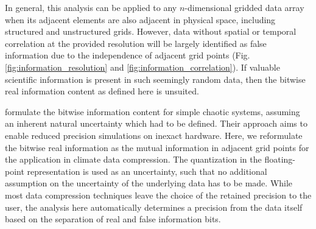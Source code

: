 In general, this analysis can be applied to any $n$-dimensional gridded data array when its adjacent elements
are also adjacent in physical space, including structured and unstructured grids. However, data without spatial
or temporal correlation at the provided resolution will be largely identified as false information due to the
independence of adjacent grid points (Fig. \ref{fig:information_resolution} and \ref{fig:information_correlation}).
If valuable scientific information is present in such seemingly random data, then the bitwise real information
content as defined here is unsuited. 

\cite{Jeffress2017} formulate the bitwise information content for simple chaotic systems, assuming an
inherent natural uncertainty which had to be defined. Their approach aims to enable reduced precision
simulations on inexact hardware. Here, we reformulate the bitwise real information as the mutual information
in adjacent grid points for the application in climate data compression. The quantization in the floating-point
representation is used as an uncertainty, such that no additional assumption on the uncertainty of the underlying
data has to be made. While most data compression techniques leave the choice of the retained precision to the user,
the analysis here automatically determines a precision from the data itself based on the separation of real and
false information bits.     


